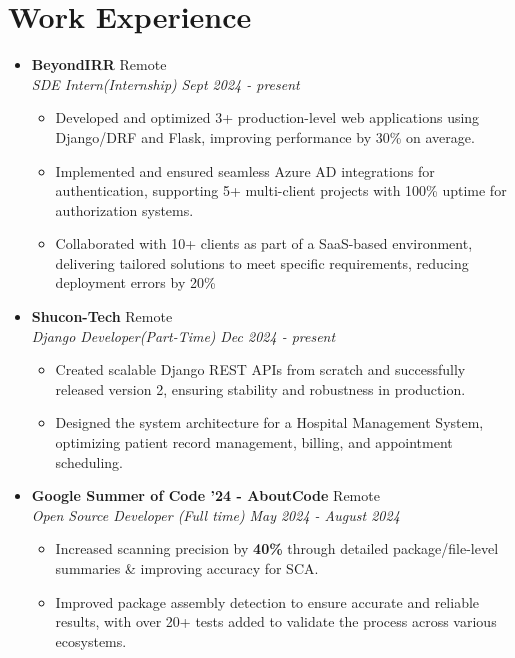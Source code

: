 \documentclass[a4,10pt]{article}
\begin{document}
\section{Work Experience}
\begin{itemize}[leftmargin=*]

\item \textbf{BeyondIRR}  \hfill {Remote} \\
\textit{SDE Intern(Internship)}  \hfill \textit{Sept 2024 - present}
\begin{itemize}[label=$\diamond$]
    \item Developed and optimized 3+ production-level web applications using Django/DRF and Flask, improving performance by 30\% on average.
    \item Implemented and ensured seamless Azure AD integrations for authentication, supporting 5+ multi-client projects with 100\% uptime for authorization systems.
    \item Collaborated with 10+ clients as part of a SaaS-based environment, delivering tailored solutions to meet specific requirements, reducing deployment errors by 20\%
\end{itemize}

\item \textbf{Shucon-Tech}  \hfill {Remote} \\
\textit{Django Developer(Part-Time)}  \hfill \textit{Dec 2024 - present}
\begin{itemize}[label=$\diamond$]
    \item Created scalable Django REST APIs from scratch and successfully released version 2, ensuring stability and robustness in production.  
    \item Designed the system architecture for a Hospital Management System, optimizing patient record management, billing, and appointment scheduling.  
\end{itemize}

\item \textbf{Google Summer of Code '24 - AboutCode}  \hfill {Remote} \\
\textit{Open Source Developer (Full time)}  \hfill \textit{May 2024 - August 2024}
\begin{itemize}[label=$\diamond$]
    \item  Increased scanning precision by \textbf{40\%} through detailed package/file-level summaries \& improving accuracy for SCA.
    \item Improved package assembly detection to ensure accurate and reliable results, with over 20+ tests added to validate the process across various ecosystems.

\end{itemize}

\end{itemize}
\end{document}
